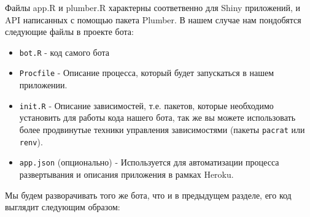 \documentclass[
]{book}
\providecommand{\tightlist}{%
  \setlength{\itemsep}{0pt}\setlength{\parskip}{0pt}}
\begin{document}
Файлы app.R и plumber.R характерны соответвенно для Shiny приложений, и API написанных с помощью пакета Plumber. В нашем случае нам пондобятся следующие файлы в проекте бота:

\begin{itemize}
\tightlist
\item
  \texttt{bot.R} - код самого бота
\item
  \texttt{Procfile} - Описание процесса, который будет запускаться в нашем приложении.
\item
  \texttt{init.R} - Описание зависимостей, т.е. пакетов, которые необходимо установить для работы кода нашего бота, так же вы можете использовать более продвинутые техники управления зависимостями (пакеты \texttt{pacrat} или \texttt{renv}).
\item
  \texttt{app.json} (опционально) - Используется для автоматизации процесса развертывания и описания приложения в рамках Heroku.
\end{itemize}

Мы будем разворачивать того же бота, что и в предыдущем разделе, его код выглядит следующим образом:
\end{document}
